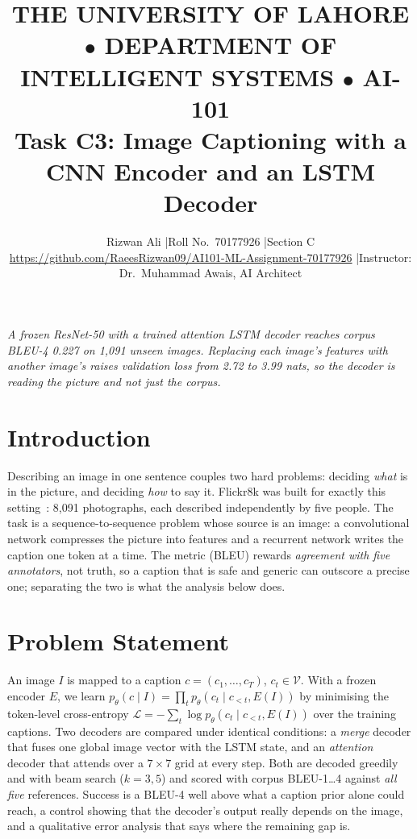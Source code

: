 \documentclass[10pt,conference]{IEEEtran}
\begin{document}
\title{\vspace{-1.2em}\normalsize THE UNIVERSITY OF LAHORE $\bullet$ DEPARTMENT OF INTELLIGENT SYSTEMS $\bullet$ AI-101\\[2pt]
\Large Task C3: Image Captioning with a CNN Encoder and an LSTM Decoder}
\author{\normalsize Rizwan Ali \quad|\quad Roll No.\ 70177926 \quad|\quad Section C\\
\normalsize\url{https://github.com/RaeesRizwan09/AI101-ML-Assignment-70177926} \quad|\quad Instructor: Dr.\ Muhammad Awais, AI Architect}
\maketitle
\vspace{-1.4em}
\begin{center}\small\itshape A frozen ResNet-50 with a trained attention LSTM decoder reaches corpus BLEU-4 0.227 on 1,091 unseen images. Replacing each image's features with another image's raises validation loss from 2.72 to 3.99 nats, so the decoder is reading the picture and not just the corpus.\end{center}
\vspace{-0.6em}

\section{Introduction}
Describing an image in one sentence couples two hard problems: deciding \emph{what} is in the
picture, and deciding \emph{how} to say it. Flickr8k was built for exactly this
setting~\cite{flickr}: 8,091 photographs, each described independently by five
people. The task is a sequence-to-sequence problem whose source is an image: a convolutional
network compresses the picture into features and a recurrent network writes the caption one token
at a time. The metric (BLEU) rewards \emph{agreement with five annotators}, not truth, so a
caption that is safe and generic can outscore a precise one; separating the two is what the
analysis below does.

\section{Problem Statement}
An image $I$ is mapped to a caption $c=(c_1,\dots,c_T)$, $c_t\in\mathcal{V}$. With a frozen
encoder $E$, we learn
$p_\theta(c\mid I)=\prod_t p_\theta(c_t\mid c_{<t}, E(I))$ by minimising the token-level
cross-entropy
$\mathcal{L}=-\sum_t \log p_\theta(c_t\mid c_{<t},E(I))$ over the training captions.
Two decoders are compared under identical conditions: a \emph{merge} decoder that fuses one
global image vector with the LSTM state, and an \emph{attention} decoder that attends over a
$7\times7$ grid at every step. Both are decoded greedily and with beam search ($k=3,5$) and scored
with corpus BLEU-1\ldots4 against \emph{all five} references. Success is a BLEU-4 well above what a
caption prior alone could reach, a control showing that the decoder's output really depends on the
image, and a qualitative error analysis that says where the remaining gap is.
\end{document}
